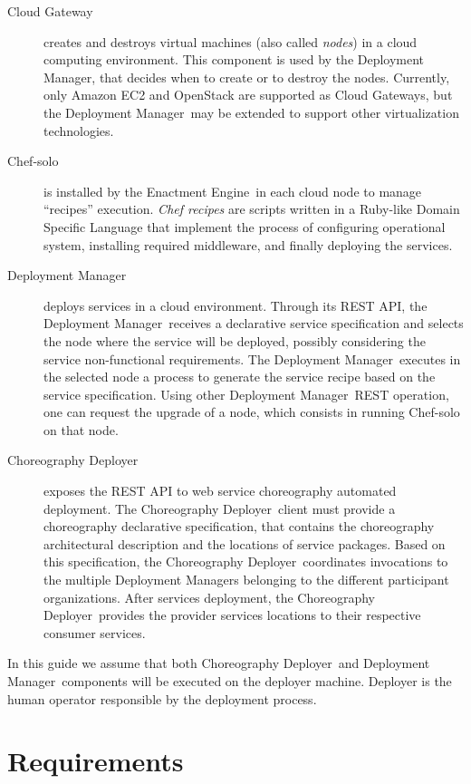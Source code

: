 \documentclass[a4paper, 10pt]{article}
\newcommand{\ee}{Enactment Engine}
\newcommand{\cd}{Choreography Deployer}
\newcommand{\dm}{Deployment Manager}
\begin{document}
\begin{description}

\item [Cloud Gateway] creates and destroys virtual machines (also called \emph{nodes}) in a cloud computing environment. This component is used by the \dm, that decides when to create or to destroy the nodes. Currently, only Amazon EC2 and OpenStack are supported as Cloud Gateways, but the \dm\ may be extended to support other virtualization technologies.

\item[Chef-solo] is installed by the \ee\ in each cloud node to manage ``recipes'' execution. \emph{Chef recipes} are scripts written in a Ruby-like Domain Specific Language that implement the process of configuring operational system, installing required middleware, and finally deploying the services.

\item [\dm] deploys services in a cloud environment. Through its REST API, the \dm\ receives a declarative service specification and selects the node where the service will be deployed, possibly considering the service non-functional requirements. The \dm\ executes in the selected node a process to generate the service recipe based on the service specification. Using other \dm\ REST operation, one can request the upgrade of a node, which consists in running Chef-solo on that node.

\item [\cd] exposes the REST API to web service choreography automated deployment. The \cd\ client must provide a choreography declarative specification, that contains the choreography architectural description and the locations of service packages. Based on this specification, the \cd\ coordinates invocations to the multiple \dm{s} belonging to the different participant organizations. After services deployment, the \cd\ provides the provider services locations to their respective consumer services.

\end{description} 

In this guide we assume that both \cd\ and \dm\ components will be executed on the deployer machine. Deployer is the human operator responsible by the deployment process. 

\section{Requirements}
\end{document}
